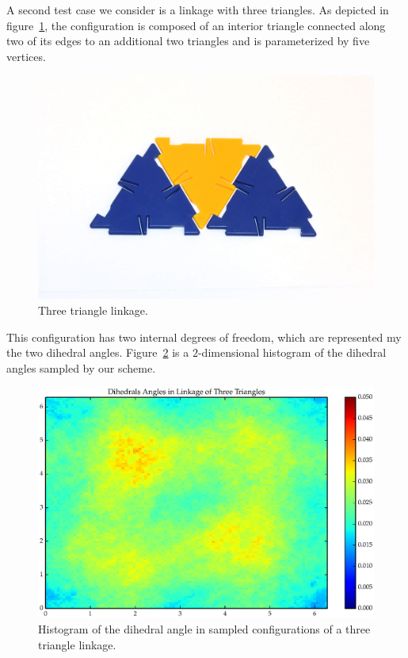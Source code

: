 A second test case we consider is a linkage with three triangles. As depicted in figure~\ref{fig:T3_diagram}, the configuration is composed of an interior triangle connected along two of its edges to an additional two triangles and is parameterized by five vertices. 
\begin{figure}[ht]
\centering
  \includegraphics[scale=0.1]{images/T3_diagram.eps}
\caption{Three triangle linkage.}
\label{fig:T3_diagram}
\end{figure}
This configuration has two internal degrees of freedom, which are represented my the two dihedral angles. Figure~\ref{fig:T3_1} is a $2$-dimensional histogram of the dihedral angles sampled by our scheme. 
\begin{figure}[ht]
\centering
  \includegraphics[scale=0.6]{images/T3_1_2D.eps}
\caption{Histogram of the dihedral angle in sampled configurations of a three triangle linkage.}
\label{fig:T3_1}
\end{figure}


